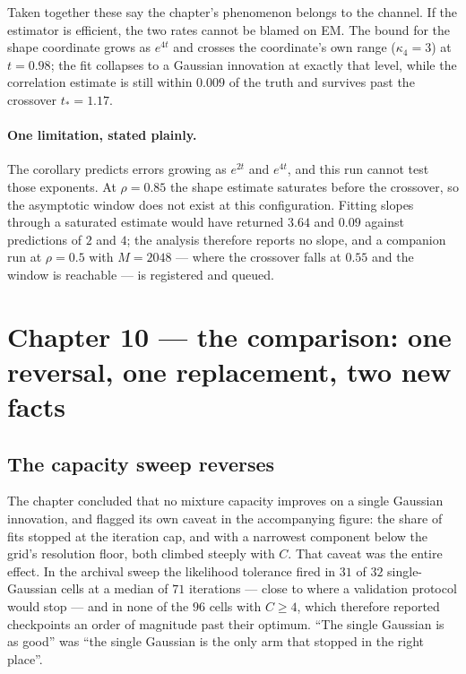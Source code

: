 \documentclass[11pt,a4paper]{article}
\begin{document}
\medskip
\noindent
Taken together these say the chapter's phenomenon belongs to the channel. If the estimator is
efficient, the two rates cannot be blamed on EM. The bound for the shape coordinate grows as
$e^{4t}$ and crosses the coordinate's own range ($\kappa_4=3$) at $t=0.98$; the fit collapses to a
Gaussian innovation at exactly that level, while the correlation estimate is still within $0.009$
of the truth and survives past the crossover $t_*=1.17$.

\paragraph{One limitation, stated plainly.}
The corollary predicts errors growing as $e^{2t}$ and $e^{4t}$, and this run cannot test those
exponents. At $\rho=0.85$ the shape estimate saturates before the crossover, so the asymptotic
window does not exist at this configuration. Fitting slopes through a saturated estimate would
have returned $3.64$ and $0.09$ against predictions of $2$ and $4$; the analysis therefore reports
no slope, and a companion run at $\rho=0.5$ with $M=2048$ --- where the crossover falls at $0.55$
and the window is reachable --- is registered and queued.

\section{Chapter 10 --- the comparison: one reversal, one replacement, two new facts}\label{sec:ch10}

\subsection{The capacity sweep reverses}

The chapter concluded that no mixture capacity improves on a single Gaussian innovation, and
flagged its own caveat in the accompanying figure: the share of fits stopped at the iteration cap,
and with a narrowest component below the grid's resolution floor, both climbed steeply with $C$.
That caveat was the entire effect. In the archival sweep the likelihood tolerance fired in $31$ of
$32$ single-Gaussian cells at a median of $71$ iterations --- close to where a validation protocol
would stop --- and in none of the $96$ cells with $C\ge4$, which therefore reported checkpoints an
order of magnitude past their optimum. ``The single Gaussian is as good'' was ``the single Gaussian
is the only arm that stopped in the right place''.
\end{document}

